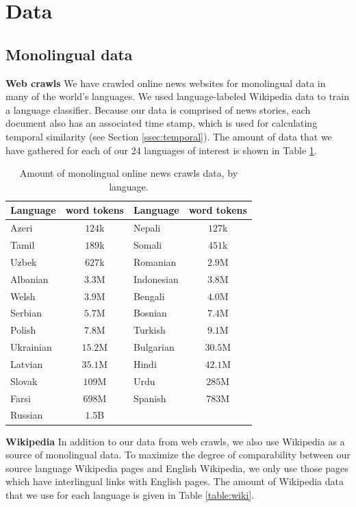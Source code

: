\documentclass[11pt]{article}
\begin{document}
\section{Data}
\subsection{Monolingual data}
{\bf Web crawls} We have crawled online news websites for monolingual data in many of the world's languages. We used language-labeled Wikipedia data to train a language classifier. Because our data is comprised of news stories, each document also has an associated time stamp, which is used for calculating temporal similarity (see Section \ref{ssec:temporal}). The amount of data that we have gathered for each of our 24 languages of interest is shown in Table \ref{table:crawls}.

\begin{table}\footnotesize
\begin{center}
\begin{tabular}{|l|c|l|c|}
\hline
Language & word tokens & Language & word tokens \\
\hline
Azeri & $124$k & Nepali & $127$k \\
Tamil & $189$k & Somali & $451$k \\
Uzbek & $627$k & Romanian & $2.9$M \\
Albanian & $3.3$M & Indonesian & $3.8$M \\
Welsh & $3.9$M & Bengali & $4.0$M \\
Serbian & $5.7$M & Bosnian & $7.4$M \\
Polish & $7.8$M & Turkish & $9.1$M \\
Ukrainian & $15.2$M & Bulgarian & $30.5$M \\
Latvian & $35.1$M & Hindi & $42.1$M \\
Slovak & $109$M & Urdu & $285$M \\
Farsi & $698$M & Spanish & $783$M \\
Russian & $1.5$B & &\\
\hline
\end{tabular}
\end{center}
\caption{\label{table:crawls}Amount of monolingual online news crawls data, by language.}
\end{table}


{\bf Wikipedia} In addition to our data from web crawls, we also use Wikipedia as a source of monolingual data. To maximize the degree of comparability between our source language Wikipedia pages and English Wikipedia, we only use those pages which have interlingual links with English pages. The amount of Wikipedia data that we use for each language is given in Table \ref{table:wiki}.
\end{document}
